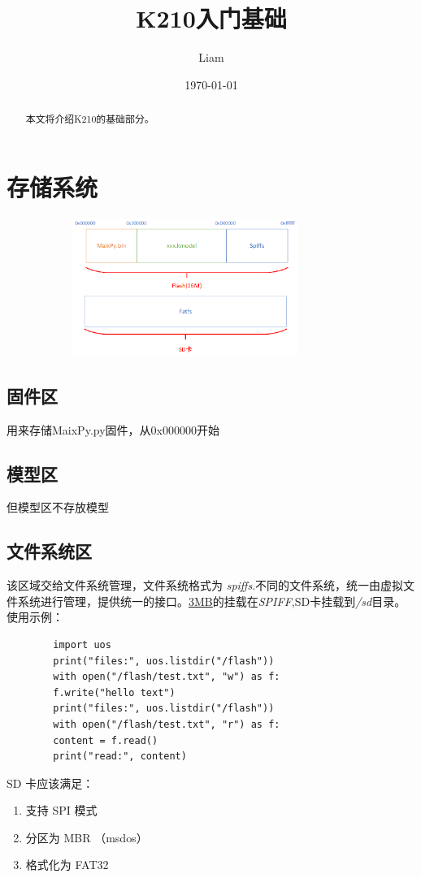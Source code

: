 \documentclass[UTF8]{ctexart}
\title{K210入门基础}
\author{Liam}
\date{\today}
\begin{document}
	\maketitle
	
	\begin{abstract}
		本文将介绍K210的基础部分。
	\end{abstract}
    \section{存储系统}
    \begin{figure}[h]
        \centering
        \includegraphics[height=4.5cm,width=9.5cm]{graph/memory.png}
        \label{1}
    \end{figure}
    \subsection*{固件区}
    用来存储MaixPy.py固件，从0x000000开始
    \subsection{模型区}
    但模型区不存放模型
    \subsection{文件系统区}
    该区域交给文件系统管理，文件系统格式为 \textit{spiffs}.不同的文件系统，统一由虚拟文件系统进行管理，提供统一的接口。\underline{3MB}的挂载在\textit{SPIFF},SD卡挂载到\textit{/sd}目录。
    使用示例：
    \lstset{language=python}
    \begin{lstlisting}
        import uos
        print("files:", uos.listdir("/flash"))
        with open("/flash/test.txt", "w") as f:
        f.write("hello text")
        print("files:", uos.listdir("/flash"))
        with open("/flash/test.txt", "r") as f:
        content = f.read()
        print("read:", content)
    \end{lstlisting}
    SD 卡应该满足：
    \begin{enumerate}
        \item 支持 SPI 模式
        \item 分区为 MBR （msdos）
        \item 格式化为 FAT32
    \end{enumerate}
\end{document}
